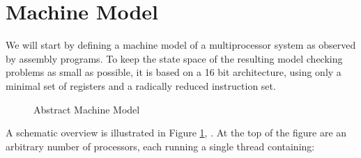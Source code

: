 
\section{Machine Model}








We will start by defining a  machine model of a multiprocessor system as observed by assembly programs.
To keep the state space of the resulting model checking problems as small as possible, it is based on a 16 bit architecture, using only a minimal set of registers and a radically reduced instruction set.

\begin{figure}[!h]
  \centering
  
  \caption{Abstract Machine Model}
  \label{fig:machine:overview}
\end{figure}

A schematic overview is illustrated in Figure \ref{fig:machine:overview}, .
At the top of the figure are an arbitrary number of  processors, each running a single  thread containing:

